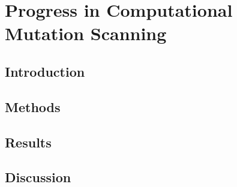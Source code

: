 \chapter[Computational Mutation Scanning]{Progress in Computational Mutation Scanning}
\label{chapter:mutation}

\section{Introduction}
\label{sec:mutation/intro}


\section{Methods}
\label{sec:mutation/methods}


\section{Results}
\label{sec:mutation/results}


\section{Discussion}
\label{sec:mutation/discussion}

